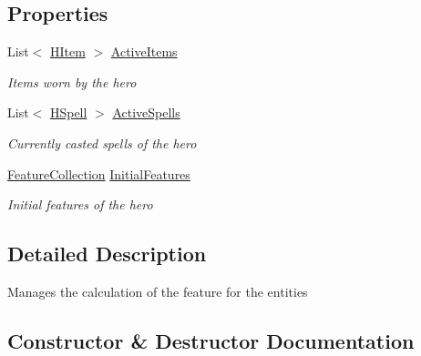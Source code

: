 \subsection*{Properties}
\begin{DoxyCompactItemize}
\item 
List$<$ \hyperlink{class_hel_project_1_1_game_world_1_1_h_item}{H\+Item} $>$ \hyperlink{class_hel_project_1_1_features_1_1_feature_manager_a12a4a1dfd4a78d9cd47ae79b6bc6b7da}{Active\+Items}
\begin{DoxyCompactList}\small\item\em Items worn by the hero \end{DoxyCompactList}\item 
List$<$ \hyperlink{class_hel_project_1_1_game_world_1_1_spells_1_1_h_spell}{H\+Spell} $>$ \hyperlink{class_hel_project_1_1_features_1_1_feature_manager_afc065fffad775f30c796536009f67e24}{Active\+Spells}
\begin{DoxyCompactList}\small\item\em Currently casted spells of the hero \end{DoxyCompactList}\item 
\hyperlink{class_hel_project_1_1_features_1_1_feature_collection}{Feature\+Collection} \hyperlink{class_hel_project_1_1_features_1_1_feature_manager_a11ca4dbbba29012ad2633728518e5dd7}{Initial\+Features}
\begin{DoxyCompactList}\small\item\em Initial features of the hero \end{DoxyCompactList}\end{DoxyCompactItemize}


\subsection{Detailed Description}
Manages the calculation of the feature for the entities 



\subsection{Constructor \& Destructor Documentation}
\hypertarget{class_hel_project_1_1_features_1_1_feature_manager_aa0f53d0bac56de1cdb4fb36c0d56708b}{}
